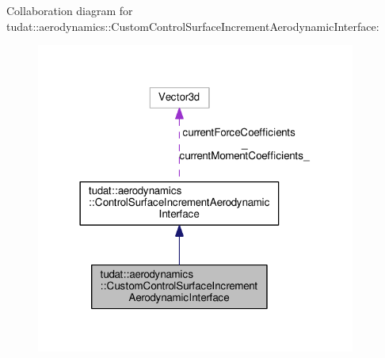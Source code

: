 Collaboration diagram for tudat\+:\+:aerodynamics\+:\+:Custom\+Control\+Surface\+Increment\+Aerodynamic\+Interface\+:
\nopagebreak
\begin{figure}[H]
\begin{center}
\leavevmode
\includegraphics[width=298pt]{classtudat_1_1aerodynamics_1_1CustomControlSurfaceIncrementAerodynamicInterface__coll__graph}
\end{center}
\end{figure}
